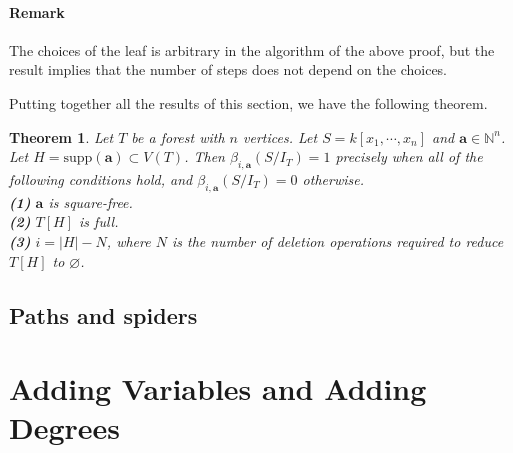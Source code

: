 \documentclass[dvipsnames,10pt]{article}
\newtheorem{theorem}{Theorem}[section]
\begin{document}
\paragraph*{Remark} The choices of the leaf is arbitrary in the algorithm of the above proof, but the result implies that the number of steps does not depend on the choices.

Putting together all the results of this section, we have the following theorem.

\begin{theorem}
    Let $T$ be a forest with $n$ vertices. Let $S=k[x_1,\cdots,x_n]$ and $\mathbf{a}\in\mathbb{N}^n$. Let $H=\mathrm{supp}(\mathbf{a})\subset V(T)$. Then $\beta_{i,\mathbf{a}}(S/I_T)=1$ precisely when all of the following conditions hold, and $\beta_{i,\mathbf{a}}(S/I_T)=0$ otherwise.\\
    \textbf{(1)} $\mathbf{a}$ is square-free.\\
    \textbf{(2)} $T[H]$ is full.\\
    \textbf{(3)} $i=|H|-N$, where $N$ is the number of deletion operations required to reduce $T[H]$ to $\varnothing$.
\end{theorem}

\subsection{Paths and spiders}



\section{Adding Variables and Adding Degrees}
\end{document}
